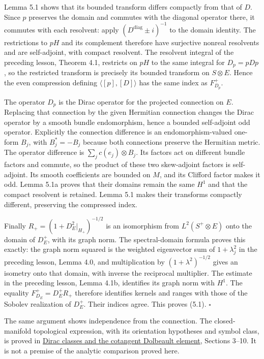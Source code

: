 \documentclass[
  11pt,
]{article}
\begin{document}
Lemma 5.1 shows that its bounded transform differs compactly from that
of \(D\). Since \(p\) preserves the domain and commutes with the
diagonal operator there, it commutes with each resolvent: apply
\((D^{\mathrm{diag}}\pm i)^{-1}\) to the domain identity. The
restrictions to \(pH\) and its complement therefore have surjective
nonreal resolvents and are self-adjoint, with compact resolvent. The
resolvent integral of the preceding lesson, Theorem 4.1, restricts on
\(pH\) to the same integral for \(D_p=pDp\), so the restricted transform
is precisely its bounded transform on \(S\otimes E\). Hence the even
compression defining \(\langle[p],[D]\rangle\) has the same index as
\(F_{D_p}^+\).

The operator \(D_p\) is the Dirac operator for the projected connection
on \(E\). Replacing that connection by the given Hermitian connection
changes the Dirac operator by a smooth bundle endomorphism, hence a
bounded self-adjoint odd operator. Explicitly the connection difference
is an endomorphism-valued one-form \(B_j\), with \(B_j^*=-B_j\) because
both connections preserve the Hermitian metric. The operator difference
is \(\sum_j c(e_j)\otimes B_j\). Its factors act on different bundle
factors and commute, so the product of these two skew-adjoint factors is
self-adjoint. Its smooth coefficients are bounded on \(M\), and its
Clifford factor makes it odd. Lemma 5.1a proves that their domains
remain the same \(H^1\) and that the compact resolvent is retained.
Lemma 5.1 makes their transforms compactly different, preserving the
compressed index.

Finally \(R_+=(1+D_E^2|_{H_+})^{-1/2}\) is an isomorphism from
\(L^2(S^+\otimes E)\) onto the domain of \(D_E^+\), with its graph norm.
The spectral-domain formula proves this exactly: the graph norm squared
is the weighted eigenvector sum of \(1+\lambda_j^2\) in the preceding
lesson, Lemma 4.0, and multiplication by \((1+\lambda^2)^{-1/2}\) gives
an isometry onto that domain, with inverse the reciprocal multiplier.
The estimate in the preceding lesson, Lemma 4.1b, identifies its graph
norm with \(H^1\). The equality \(F_{D_E}^+=D_E^+R_+\) therefore
identifies kernels and ranges with those of the Sobolev realization of
\(D_E^+\). Their indices agree. This proves (5.1). \(\square\)

The same argument shows independence from the connection. The
closed-manifold topological expression, with its orientation hypotheses
and symbol class, is proved in \href{KT-KK-15.html}{Dirac classes and
the cotangent Dolbeault element}, Sections 3--10. It is not a premise of
the analytic comparison proved here.
\end{document}
